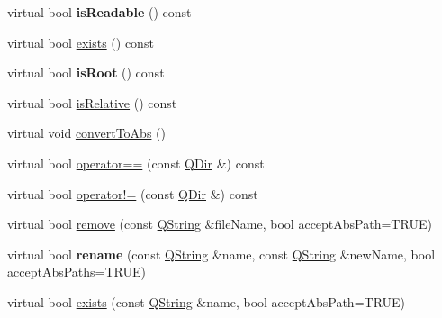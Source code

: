 \begin{DoxyCompactItemize}
\item 
\hypertarget{class_q_dir_a3d7f091ba732d3899bcb34dde9fbfd63}{virtual bool {\bfseries is\-Readable} () const }\label{class_q_dir_a3d7f091ba732d3899bcb34dde9fbfd63}

\item 
virtual bool \hyperlink{class_q_dir_a74bdced855aaba94868b77f21398775c}{exists} () const 
\item 
\hypertarget{class_q_dir_adb67b2a249620b49f23a8bc03cbdb3b0}{virtual bool {\bfseries is\-Root} () const }\label{class_q_dir_adb67b2a249620b49f23a8bc03cbdb3b0}

\item 
virtual bool \hyperlink{class_q_dir_ad6802e0e235015f0503e36db60d819e8}{is\-Relative} () const 
\item 
virtual void \hyperlink{class_q_dir_a92c71858159be3400795711ad6d8f584}{convert\-To\-Abs} ()
\item 
virtual bool \hyperlink{class_q_dir_a3928ea4a4e6a7b29212b20aa97d81c93}{operator==} (const \hyperlink{class_q_dir}{Q\-Dir} \&) const 
\item 
virtual bool \hyperlink{class_q_dir_a311829a9fc8fd8ad8d9aefbdc876d8f7}{operator!=} (const \hyperlink{class_q_dir}{Q\-Dir} \&) const 
\item 
virtual bool \hyperlink{class_q_dir_acbe0d2cbf0b30d6231f8bb9892551282}{remove} (const \hyperlink{class_q_string}{Q\-String} \&file\-Name, bool accept\-Abs\-Path=T\-R\-U\-E)
\item 
\hypertarget{class_q_dir_a20c80ba9cd68d8518cf6f6fdb04ebf87}{virtual bool {\bfseries rename} (const \hyperlink{class_q_string}{Q\-String} \&name, const \hyperlink{class_q_string}{Q\-String} \&new\-Name, bool accept\-Abs\-Paths=T\-R\-U\-E)}\label{class_q_dir_a20c80ba9cd68d8518cf6f6fdb04ebf87}

\item 
virtual bool \hyperlink{class_q_dir_ae3b618b65c524ca053bc9acdda935a21}{exists} (const \hyperlink{class_q_string}{Q\-String} \&name, bool accept\-Abs\-Path=T\-R\-U\-E)
\end{DoxyCompactItemize}
